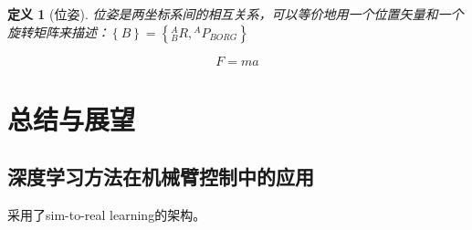 \documentclass[a4paper,12pt]{report}
\newtheorem{definition}{定义}
\begin{document}
\begin{definition}[位姿]
    位姿是两坐标系间的相互关系，可以等价地用一个位置矢量和一个旋转矩阵来描述：$\left\{ B \right\} = \left\{ {{}_B^AR,{}^A{P_{BORG}}} \right\}$
\end{definition}

\begin{equation}
    F=ma
\end{equation}

\chapter{总结与展望}

\section{深度学习方法在机械臂控制中的应用}

\cite{wilson2019learning}采用了sim-to-real learning的架构。



\printbibliography

\end{document}
